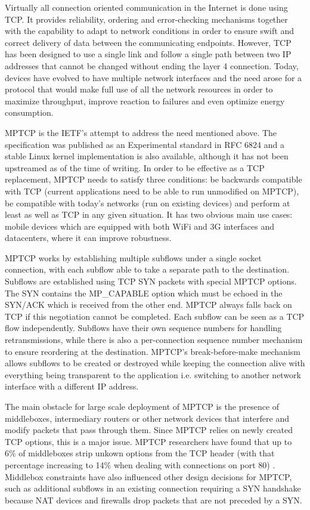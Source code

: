 
Virtually all connection oriented communication in the Internet is done using TCP. It provides reliability, ordering and error-checking mechanisms together with the capability to adapt to network conditions in order to ensure swift and correct delivery of data between the communicating endpoints. However, TCP has been designed to use a single link and follow a single path between two IP addresses that cannot be changed without ending the layer 4 connection. Today, devices have evolved to have multiple network interfaces and the need arose for a protocol that would make full use of all the network resources in order to maximize throughput, improve reaction to failures and even optimize energy consumption. 

MPTCP is the IETF's attempt to address the need mentioned above. The specification was published as an Experimental standard in RFC 6824 and a stable Linux kernel implementation is also available, although it has not been upstreamed as of the time of writing. In order to be effective as a TCP replacement, MPTCP needs to satisfy three conditions: be backwards compatible with TCP (current applications need to be able to run unmodified on MPTCP), be compatible with today's networks (run on existing devices) and perform at least as well as TCP in any given situation. It has two obvious main use cases: mobile devices which are equipped with both WiFi and 3G interfaces and datacenters, where it can improve robustness.

MPTCP works by establishing multiple subflows under a single socket
connection, with each subflow able to take a separate path to the destination.
Subflows are established using TCP SYN packets with special MPTCP options. The
SYN contains the MP_CAPABLE option which must be echoed in the SYN/ACK which
is received from the other end. MPTCP always falls back on TCP if this
negotiation cannot be completed. Each subflow can be seen as a TCP flow
independently. Subflows have their own sequence numbers for handling
retransmissions, while there is also a per-connection sequence number mechanism
to ensure reordering at the destination. MPTCP's break-before-make mechanism
allows subflows to be created or destroyed while keeping the connection alive
with everything being transparent to the application i.e. switching to another
network interface with a different IP address.

The main obstacle for large scale deployment of MPTCP is the presence of
middleboxes, intermediary routers or other network devices that interfere and
modify packets that pass through them. Since MPTCP relies on newly created TCP
options, this is a major issue. MPTCP researchers have found that up to 6\% of
middleboxes strip unkown options from the TCP header (with that percentage
increasing to 14\% when dealing with connections on port 80)
\cite{how-hard-can-it-be}. Middlebox constraints have also influenced other
design decisions for MPTCP, such as additional subflows in an existing
connection requiring a SYN handshake because NAT devices and firewalls drop
packets that are not preceded by a SYN.

